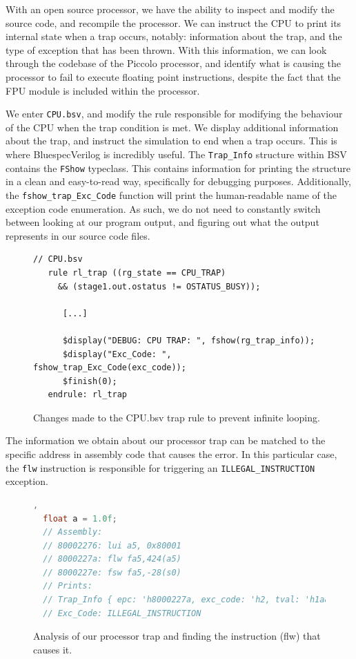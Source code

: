 \documentclass[a4paper,8pt]{report}
\begin{document}
With an open source processor, we have the ability to inspect and modify the
source code, and recompile the processor. We can instruct the CPU to print its
internal state when a trap occurs, notably: information about the trap, and the
type of exception that has been thrown. With this information, we can look
through the codebase of the Piccolo processor, and identify what is causing the
processor to fail to execute floating point instructions, despite the fact that
the FPU module is included within the processor.

We enter \texttt{CPU.bsv}, and modify the rule responsible for modifying the
behaviour of the CPU when the trap condition is met. We display additional
information about the trap, and instruct the simulation to end when a trap
occurs. This is where BluespecVerilog is incredibly useful. The
\texttt{Trap\_Info} structure within BSV contains the \texttt{FShow} typeclass.
This contains information for printing the structure in a clean and easy-to-read
way, specifically for debugging purposes. Additionally, the
\texttt{fshow\_trap\_Exc\_Code} function will print the human-readable name of
the exception code enumeration. As such, we do not need to constantly switch
between looking at our program output, and figuring out what the output
represents in our source code files.

\begin{figure}[h]
\begin{verbatim}
// CPU.bsv
   rule rl_trap ((rg_state == CPU_TRAP)
     && (stage1.out.ostatus != OSTATUS_BUSY));

      [...]

      $display("DEBUG: CPU TRAP: ", fshow(rg_trap_info));
      $display("Exc_Code: ", fshow_trap_Exc_Code(exc_code));
      $finish(0);
   endrule: rl_trap
\end{verbatim}
\caption{Changes made to the CPU.bsv trap rule to prevent infinite looping.}
\end{figure}

The information we obtain about our processor trap can be matched to the
specific address in assembly code that causes the error. In this particular
case, the \texttt{flw} instruction is responsible for triggering an
\texttt{ILLEGAL\_INSTRUCTION} exception.
\begin{figure}[h]
\begin{lstlisting}[language=C,style=customc,xleftmargin=.05\textwidth],
  float a = 1.0f;
  // Assembly:
  // 80002276: lui a5, 0x80001
  // 8000227a: flw fa5,424(a5)
  // 8000227e: fsw fa5,-28(s0)
  // Prints:
  // Trap_Info { epc: 'h8000227a, exc_code: 'h2, tval: 'h1a87a787 }
  // Exc_Code: ILLEGAL_INSTRUCTION
\end{lstlisting}
\caption{Analysis of our processor trap and finding the instruction (flw) that causes
it.}
\end{figure}
\end{document}
